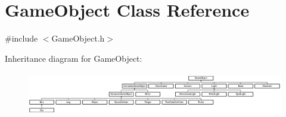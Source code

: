 \hypertarget{class_game_object}{}\section{Game\+Object Class Reference}
\label{class_game_object}


{\ttfamily \#include $<$Game\+Object.\+h$>$}

Inheritance diagram for Game\+Object\+:\begin{figure}[H]
\begin{center}
\leavevmode
\includegraphics[height=1.931034cm]{class_game_object}
\end{center}
\end{figure}
